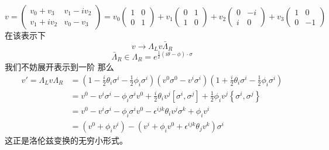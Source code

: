 \begin{equation}
v=\left(\begin{array}{cc}
v_{0}+v_{3} & v_{1}-i v_{2} \\
v_{1}+i v_{2} & v_{0}-v_{3}
\end{array}\right)=v_{0}\left(\begin{array}{cc}
1 & 0 \\
0 & 1
\end{array}\right)+v_{1}\left(\begin{array}{cc}
0 & 1 \\
1 & 0
\end{array}\right)+v_{2}\left(\begin{array}{cc}
0 & -i \\
i & 0
\end{array}\right)+v_{3}\left(\begin{array}{cc}
1 & 0 \\
0 & -1
\end{array}\right)
\end{equation}
在该表示下
\begin{equation}
v\rightarrow\Lambda_{L}v \bar{\Lambda}_{R}
\end{equation}
\begin{equation}
\bar{\Lambda}_{R}\in\Lambda_{R}=e^{\frac{1}{2}(i \theta-\phi) \cdot \sigma}
\end{equation}
我们不妨展开表示到一阶
那么
\begin{equation}
\begin{aligned}
v'=\Lambda_{L} v \Lambda_{R} &=\left(1-\frac{i}{2} \theta_{i} \sigma^{i}-\frac{1}{2} \phi_{i} \sigma^{i}\right)\left(v^{0}\sigma^0-v^{i} \sigma^{i}\right)\left(1+\frac{i}{2} \theta_{i} \sigma^{i}-\frac{1}{2} \phi_{i} \sigma^{i}\right) \\
&=v^{0}-v^{i} \sigma^{i}-\phi_{i} \sigma^{i} v^{0}+\frac{i}{2} \theta_{i} v^{j}\left[\sigma^{i}, \sigma^{j}\right]+\frac{1}{2} \phi_{i} v^{j}\left\{\sigma^{i}, \sigma^{j}\right\} \\
&=v^{0}-v^{i} \sigma^{i}-\phi_{i} \sigma^{i} v^{0}-\epsilon^{i j k} \theta_{i} v^{j} \sigma^{k}+\phi_{i} v^{i} \\
&=\left(v^{0}+\phi_{i} v^{i}\right)-\left(v^{i}+\phi_{i} v^{0}+\epsilon^{i j k} \theta_{j} v^{k}\right) \sigma^{i}
\end{aligned}
\end{equation}
这正是洛伦兹变换的无穷小形式。
